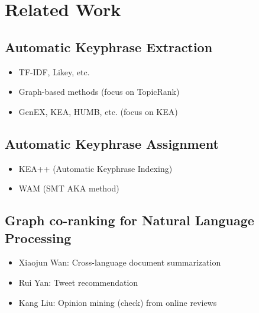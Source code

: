 \section{Related Work}
\label{sec:related_work}

  \subsection{Automatic Keyphrase Extraction}
  \label{subsec:ake}
    \begin{itemize}
      \item{TF-IDF, Likey, etc.}
      \item{Graph-based methods (focus on TopicRank)}
      \item{GenEX, KEA, HUMB, etc. (focus on KEA)}
    \end{itemize}

  \subsection{Automatic Keyphrase Assignment}
  \label{subsec:aka}
    \begin{itemize}
      \item{KEA++ (Automatic Keyphrase Indexing)}
      \item{WAM (SMT AKA method)}
    \end{itemize}

  \subsection{Graph co-ranking for Natural Language Processing}
  \label{subsec:graph_co_ranking_for_nlp}
    \begin{itemize}
      \item{Xiaojun Wan: Cross-language document summarization}
      \item{Rui Yan: Tweet recommendation}
      \item{Kang Liu: Opinion mining (check) from online reviews}
    \end{itemize}

